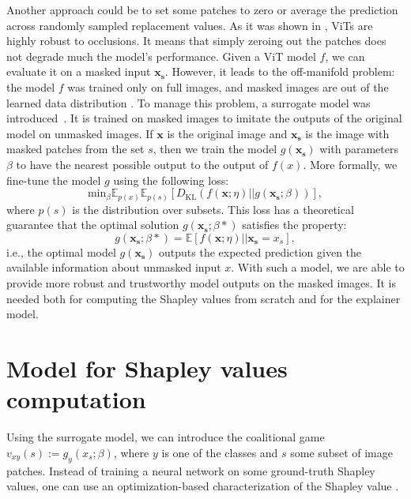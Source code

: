 \documentclass[magisterska,en]{pracamgr}
\begin{document}
Another approach could be to set some patches to zero or average the prediction across randomly sampled replacement values. As it was shown in \cite{DBLP:conf/nips/NaseerRKHKY21}, ViTs are highly robust to occlusions. It means that simply zeroing out the patches does not degrade much the model's performance.  Given a ViT model $f$, we can evaluate it on a masked input $\mathbf{x_s}$. However, it leads to the off-manifold problem: the model $f$ was trained only on full images, and masked images are out of the learned data distribution \cite{DBLP:conf/aistats/TaufiqBM23}.  To manage this problem, a surrogate model was introduced~\cite{DBLP:conf/iclr/FryeMBCSF21}. It is trained on masked images to imitate the outputs of the original model on unmasked images. If $\mathbf{x}$ is the original image and $\mathbf{x_s}$ is the image with masked patches from the set $s$, then we train the model $g(\mathbf{x_s})$ with parameters $\beta$ to have the nearest possible output to the output of $f(x)$. More formally, we fine-tune the model $g$ using the following loss:
\begin{equation*}
    \textrm{min}_{\beta} \mathbb{E}_{p(x)} \mathbb{E}_{p(s)} \left[D_{\textrm{KL}} \left(f(\mathbf{x};\eta) || g(\mathbf{x_s};\beta)\right)\right],
\end{equation*}
where $p(s)$ is the distribution over subsets. This loss has a theoretical guarantee that the optimal solution $g(\mathbf{x_s};\beta*)$ satisfies the property:
\begin{equation*}
    g(\mathbf{x_s};\beta*) = \mathbb{E}\left[f(\mathbf{x};\eta) || \mathbf{x_s}=x_s \right],
\end{equation*}
i.e., the optimal model $g(\mathbf{x_s})$ outputs the expected prediction given the available information about unmasked input $x$. With such a model, we are able to provide more robust and trustworthy model outputs on the masked images. It is needed both for computing the Shapley values from scratch and for the explainer model.

\section{Model for Shapley values computation}\label{s:explainer_model}
Using the surrogate model, we can introduce the coalitional game $v_{xy}(s) := g_y(x_s;\beta)$, where $y$ is one of the classes and $s$ some subset of image patches. Instead of training a neural network on some ground-truth Shapley values, one can use an optimization-based characterization of the Shapley value  \cite{Characterization}.
\end{document}
